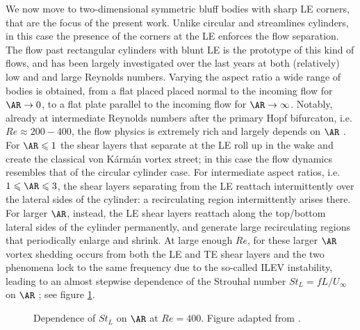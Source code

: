 \documentclass{jfm}
\begin{document}
We now move to two-dimensional symmetric bluff bodies with sharp LE corners, that are the focus of the present work. Unlike circular and streamlines cylinders, in this case the presence of the corners at the LE enforces the flow separation. The flow past rectangular cylinders with blunt LE is the prototype of this kind of flows, and has been largely investigated over the last years at both (relatively) low \citep{hourigan-thompson-tan-2001,zhang-etal-2023} and and large \citep{cimarelli-leonforte-angeli-2018,chiarini-etal-2022,cimarelli-etal-2024} Reynolds numbers. Varying the aspect ratio a wide range of bodies is obtained, from a flat placed placed normal to the incoming flow for $\AR \rightarrow 0$, to a flat plate parallel to the incoming flow for $\AR \rightarrow \infty$. Notably, already at intermediate Reynolds numbers after the primary Hopf bifurcaton, i.e. $Re \approx 200-400$, the flow physics is extremely rich and largely depends on $\AR$ \citep[see for example][]{okajima-1982,nakamura-etal-1991,mills-etal-1995}. For $\AR \le 1$ the shear layers that separate at the LE roll up in the wake and create the classical von K\'{a}rm\'{a}n vortex street; in this case the flow dynamics resembles that of the circular cylinder case. For intermediate aspect ratios, i.e. $1 \le \AR \le 3$, the shear layers separating from the LE reattach intermittently over the lateral sides of the cylinder: a recirculating region intermittently arises there. For larger $\AR$, instead, the LE shear layers reattach along the top/bottom lateral sides of the cylinder permanently, and generate large recirculating regions that periodically enlarge and shrink. At large enough $Re$, for these larger $\AR$ vortex shedding occurs from both the LE and TE shear layers and the two phenomena lock to the same frequency due to the so-called ILEV instability, leading to an almost stepwise dependence of the Strouhal number $St_L=fL/U_\infty$ on $\AR$ \citep{okajima-1982,nakamura-etal-1991,hourigan-thompson-tan-2001}; see figure \ref{fig:StLAR}. 
%
\begin{figure}
  \centering
   
   \caption{Dependence of $St_L$ on $\AR$ at $Re=400$. Figure adapted from \cite{chiarini-quadrio-auteri-2022}.}
   \label{fig:StLAR}
\end{figure}
%
\end{document}
